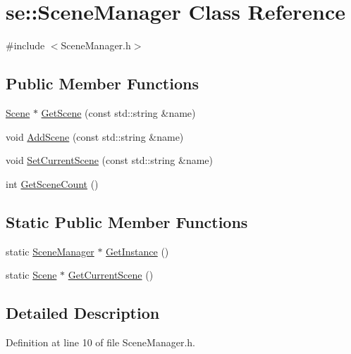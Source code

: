 \hypertarget{classse_1_1_scene_manager}{}\section{se\+:\+:Scene\+Manager Class Reference}
\label{classse_1_1_scene_manager}


{\ttfamily \#include $<$Scene\+Manager.\+h$>$}

\subsection*{Public Member Functions}
\begin{DoxyCompactItemize}
\item 
\mbox{\hyperlink{classse_1_1_scene}{Scene}} $\ast$ \mbox{\hyperlink{classse_1_1_scene_manager_a07360d102e47455f497c844d7ad36ecb}{Get\+Scene}} (const std\+::string \&name)
\item 
void \mbox{\hyperlink{classse_1_1_scene_manager_a9ad26f193f547285f4eae5c440f24a10}{Add\+Scene}} (const std\+::string \&name)
\item 
void \mbox{\hyperlink{classse_1_1_scene_manager_a8eff0a05036942247f81fe4915ffce50}{Set\+Current\+Scene}} (const std\+::string \&name)
\item 
int \mbox{\hyperlink{classse_1_1_scene_manager_aac6929d7dfd933c4d40fbf66b3740321}{Get\+Scene\+Count}} ()
\end{DoxyCompactItemize}
\subsection*{Static Public Member Functions}
\begin{DoxyCompactItemize}
\item 
static \mbox{\hyperlink{classse_1_1_scene_manager}{Scene\+Manager}} $\ast$ \mbox{\hyperlink{classse_1_1_scene_manager_a670006ca4d20028e0778074e94fa0640}{Get\+Instance}} ()
\item 
static \mbox{\hyperlink{classse_1_1_scene}{Scene}} $\ast$ \mbox{\hyperlink{classse_1_1_scene_manager_a79b72ff927600fa9ef24f1dae177b566}{Get\+Current\+Scene}} ()
\end{DoxyCompactItemize}


\subsection{Detailed Description}


Definition at line 10 of file Scene\+Manager.\+h.



